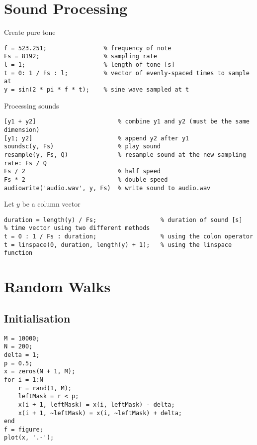 \documentclass{article}
\begin{document}
\section*{Sound Processing}
Create pure tone
\begin{lstlisting}
f = 523.251;                % frequency of note
Fs = 8192;                  % sampling rate
l = 1;                      % length of tone [s]
t = 0: 1 / Fs : l;          % vector of evenly-spaced times to sample at
y = sin(2 * pi * f * t);    % sine wave sampled at t
\end{lstlisting}
Processing sounds
\begin{lstlisting}
[y1 + y2]                       % combine y1 and y2 (must be the same dimension)
[y1; y2]                        % append y2 after y1
soundsc(y, Fs)                  % play sound 
resample(y, Fs, Q)              % resample sound at the new sampling rate: Fs / Q
Fs / 2                          % half speed
Fs * 2                          % double speed
audiowrite('audio.wav', y, Fs)  % write sound to audio.wav
\end{lstlisting}
Let $y$ be a column vector
\begin{lstlisting}
duration = length(y) / Fs;                  % duration of sound [s]
% time vector using two different methods
t = 0 : 1 / Fs : duration;                  % using the colon operator
t = linspace(0, duration, length(y) + 1);   % using the linspace function
\end{lstlisting}
\section*{Random Walks}
\subsection*{Initialisation}
\begin{lstlisting}
M = 10000;
N = 200;
delta = 1;
p = 0.5;
x = zeros(N + 1, M);
for i = 1:N
    r = rand(1, M);
    leftMask = r < p;
    x(i + 1, leftMask) = x(i, leftMask) - delta;
    x(i + 1, ~leftMask) = x(i, ~leftMask) + delta;
end
f = figure;
plot(x, '.-');

\end{lstlisting}
\end{document}
